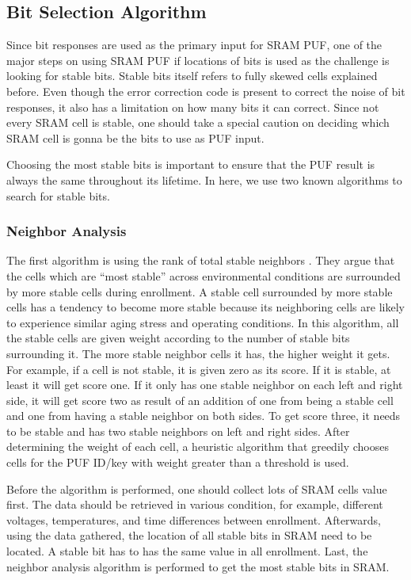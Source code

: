 \subsection{Bit Selection Algorithm} \label{lbl:bit-selection}
Since bit responses are used as the primary input for SRAM PUF, one of the major steps on using SRAM PUF if locations of bits is used as the challenge is looking for stable bits. Stable bits itself refers to fully skewed cells explained before.
Even though the error correction code is present to correct the noise of bit responses, it also has a limitation on how many bits it can correct.
Since not every SRAM cell is stable, one should take a special caution on deciding which SRAM cell is gonna be the bits to use as PUF input.

Choosing the most stable bits is important to ensure that the PUF result is always the same throughout its lifetime.
In here, we use two known algorithms to search for stable bits.

\subsubsection{Neighbor Analysis}
The first algorithm is using the rank of total stable neighbors \cite{xiao_rahman_forte_huang_su_tehranipoor_2014}. They argue that the cells which are “most stable” across environmental conditions are surrounded by more stable cells during enrollment. A stable cell surrounded by more stable cells has a tendency to become more stable because its neighboring cells are likely to experience similar aging stress and operating conditions.
In this algorithm, all the stable cells are given weight according to the number of stable bits surrounding it.
The more stable neighbor cells it has, the higher weight it gets. For example, if a cell is not stable, it is given zero as its score. If it is stable, at least it will get score one. If it only has one stable neighbor on each left and right side, it will get score two as result of an addition of one from being a stable cell and one from having a stable neighbor on both sides. To get score three, it needs to be stable and has two stable neighbors on left and right sides.
After determining the weight of each cell, a heuristic algorithm that greedily chooses cells for the PUF ID/key with weight greater than a threshold is used.

Before the algorithm is performed, one should collect lots of SRAM cells value first. The data should be retrieved in various condition, for example, different voltages, temperatures, and time differences between enrollment.
Afterwards, using the data gathered, the location of all stable bits in SRAM need to be located. A stable bit has to has the same value in all enrollment.
Last, the neighbor analysis algorithm is performed to get the most stable bits in SRAM.

